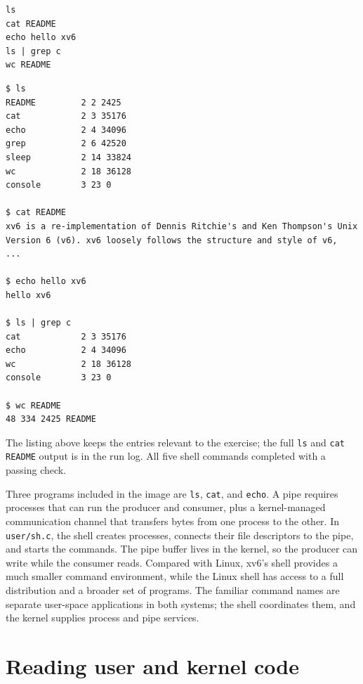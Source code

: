 \documentclass{assets/utmreport}
\begin{document}
\noindent\begin{minipage}{\linewidth}
\begin{lstlisting}[caption={Example xv6 shell commands from the assignment}]
ls
cat README
echo hello xv6
ls | grep c
wc README
\end{lstlisting}
\end{minipage}\par


\noindent\begin{minipage}{\linewidth}
\begin{lstlisting}[caption={Captured xv6 shell command results}]
$ ls
README         2 2 2425
cat            2 3 35176
echo           2 4 34096
grep           2 6 42520
sleep          2 14 33824
wc             2 18 36128
console        3 23 0

$ cat README
xv6 is a re-implementation of Dennis Ritchie's and Ken Thompson's Unix
Version 6 (v6). xv6 loosely follows the structure and style of v6,
...

$ echo hello xv6
hello xv6

$ ls | grep c
cat            2 3 35176
echo           2 4 34096
wc             2 18 36128
console        3 23 0

$ wc README
48 334 2425 README
\end{lstlisting}
\end{minipage}\par


The listing above keeps the entries relevant to the exercise; the full \texttt{ls} and \texttt{cat README} output is in the run log. All five shell commands completed with a passing check.

Three programs included in the image are \texttt{ls}, \texttt{cat}, and \texttt{echo}. A pipe requires processes that can run the producer and consumer, plus a kernel-managed communication channel that transfers bytes from one process to the other. In \texttt{user/sh.c}, the shell creates processes, connects their file descriptors to the pipe, and starts the commands. The pipe buffer lives in the kernel, so the producer can write while the consumer reads. Compared with Linux, xv6's shell provides a much smaller command environment, while the Linux shell has access to a full distribution and a broader set of programs. The familiar command names are separate user-space applications in both systems; the shell coordinates them, and the kernel supplies process and pipe services.

\section{Reading user and kernel code}
\end{document}
